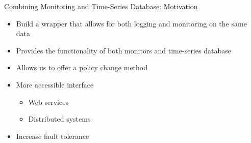 \begin{frame}{Combining Monitoring and Time-Series Database: Motivation}
    \begin{itemize}
        \item Build a wrapper that allows for both logging and monitoring on the same data
        \item Provides the functionality of both monitors and time-series database
        \item Allows us to offer a policy change method
        \item More accessible interface
        \begin{itemize}
            \item Web services
            \item Distributed systems
        \end{itemize}
        \item Increase fault tolerance
    \end{itemize}
    
\end{frame}

